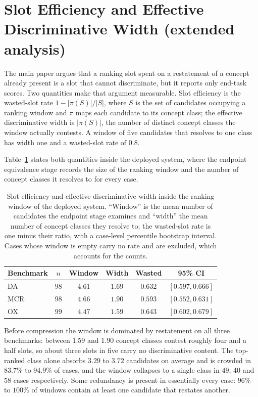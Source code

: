 \documentclass[letterpaper]{article}
\begin{document}
\section{Slot Efficiency and Effective Discriminative Width (extended analysis)}
\label{sec:slots}

The main paper argues that a ranking slot spent on a restatement of a concept already present is a slot that cannot discriminate, but it reports only end-task scores.
Two quantities make that argument measurable.
Slot efficiency is the wasted-slot rate $1 - |\pi(S)| / |S|$, where $S$ is the set of candidates occupying a ranking window and $\pi$ maps each candidate to its concept class; the effective discriminative width is $|\pi(S)|$, the number of distinct concept classes the window actually contests.
A window of five candidates that resolves to one class has width one and a wasted-slot rate of $0.8$.

Table~\ref{tab:slots-mech} states both quantities inside the deployed system, where the endpoint equivalence stage records the size of the ranking window and the number of concept classes it resolves to for every case.

\begin{table}[tb]
\centering
\footnotesize
\setlength{\tabcolsep}{4pt}
\begin{tabular}{@{}lccccc@{}}
\toprule
Benchmark & $n$ & Window & Width & Wasted & 95\% CI \\
\midrule
DA  & $98$ & $4.61$ & $1.69$ & $0.632$ & $[0.597, 0.666]$ \\
MCR & $98$ & $4.66$ & $1.90$ & $0.593$ & $[0.552, 0.631]$ \\
OX  & $99$ & $4.47$ & $1.59$ & $0.643$ & $[0.602, 0.679]$ \\
\bottomrule
\end{tabular}
\caption{Slot efficiency and effective discriminative width inside the ranking window of the deployed system. ``Window'' is the mean number of candidates the endpoint stage examines and ``width'' the mean number of concept classes they resolve to; the wasted-slot rate is one minus their ratio, with a case-level percentile bootstrap interval. Cases whose window is empty carry no rate and are excluded, which accounts for the counts.}
\label{tab:slots-mech}
\end{table}

Before compression the window is dominated by restatement on all three benchmarks: between $1.59$ and $1.90$ concept classes contest roughly four and a half slots, so about three slots in five carry no discriminative content.
The top-ranked class alone absorbs $3.29$ to $3.72$ candidates on average and is crowded in $83.7\%$ to $94.9\%$ of cases, and the window collapses to a single class in $49$, $40$ and $58$ cases respectively.
Some redundancy is present in essentially every case: $96\%$ to $100\%$ of windows contain at least one candidate that restates another.
\end{document}
